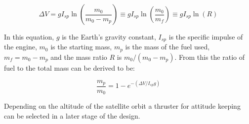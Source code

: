 \begin{equation}
\Delta V = g I_{sp} \ln{\left(\frac{m_0}{m_0-m_p}\right)}\equiv g I_{sp} \ln{\left(\frac{m_0}{m_f}\right)} \equiv g I_{sp} \ln{\left(R\right)}
\label{eqn:tsiolkovsky}
\end{equation}

In this equation, $g$ is the Earth's gravity constant, $I_{sp}$ is the specific impulse of the engine, $m_0$ is the starting mass, $m_p$ is the mass of the fuel used, $m_f = m_0-m_p$ and the mass ratio $R$ is  ${m_0}/\left({m_0-m_p}\right)$. From this the ratio of fuel to the total mass can be derived to be:

\begin{equation}
\frac{m_p}{m_0} = 1-e^{-\left(\Delta V/I_{sp}g\right)}
\label{eqn:fuelratio}
\end{equation}

Depending on the altitude of the satellite orbit a thruster for attitude keeping can be selected in a later stage of the design.